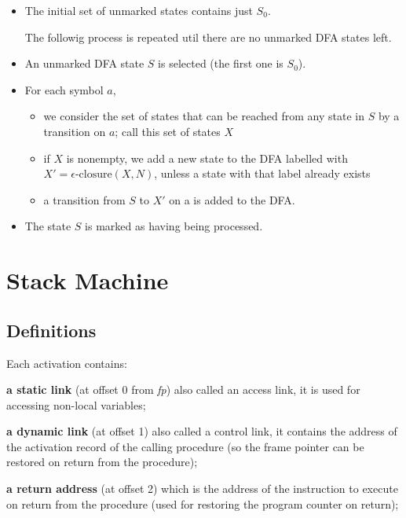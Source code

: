 \documentclass[fontsize=10pt,a4paper]{article}
\begin{document}
\begin{multicols}{3}
\begin{itemize}
        \item The initial set of unmarked states contains just $S_0$.

        The followig process is repeated util there are no unmarked DFA states left.

        \item An unmarked DFA state $S$ is selected (the first one is $S_0$).

        \item For each symbol $a$,

        \begin{itemize}
            \item we consider the set of states that can be reached from any state in $S$ by a transition on $a$; call this set of states $X$
            \item if $X$ is nonempty, we add a new state to the DFA labelled with $X' = \epsilon\text{-closure}(X, N)$, unless a state with that label already exists
            \item a transition from $S$ to $X'$ on a is added to the DFA.
        \end{itemize}

        \item The state $S$ is marked as having being processed.

    \end{itemize}

    \section{Stack Machine}

    \subsection{Definitions}

    Each activation contains:

    \textbf{a static link} (at offset 0 from \textit{fp}) also called an access link, it is used for accessing non-local variables;

    \textbf{a dynamic link} (at offset 1) also called a control link, it contains the address of the activation record of the calling procedure (so the frame pointer can be restored on return from the procedure);

    \textbf{a return address} (at offset 2) which is the address of the instruction to execute on return from the procedure (used for restoring the program counter on return);


\end{multicols}
\end{document}
